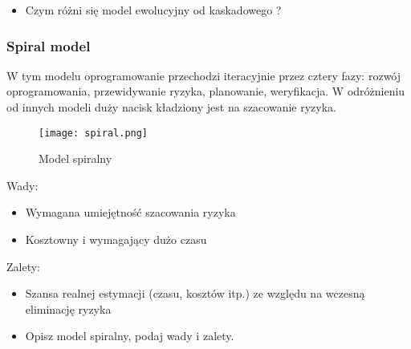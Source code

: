 \documentclass[a4paper,15pt]{article}
\newcommand{\definition}[2]{
    \begin{tcolorbox}[colback=gray!5!white,colframe=gray,title={Definicja -  #1}]
        #2
    \end{tcolorbox}
}
\begin{document}
\begin{framed}
\begin{itemize}
\item Czym różni się model ewolucyjny od kaskadowego ?
\end{itemize}
\end{framed}




\newpage
\subsubsection{Spiral model}


\definition{Spiral model}{
W tym modelu oprogramowanie przechodzi iteracyjnie przez cztery fazy: rozwój oprogramowania, przewidywanie ryzyka, planowanie, weryfikacja. W odróżnieniu od innych modeli duży nacisk kładziony jest na szacowanie ryzyka.
\begin{figure}[H]
\centerline{\texttt{[image: spiral.png]}}
\caption{Model spiralny}
\label{fig:ANTIinhibitor}
\end{figure}

}

\begin{tcolorbox}[colback=red!5!white,colframe=red!75!black]
  Wady:
  \begin{itemize}
  	\item Wymagana umiejętność szacowania ryzyka
  	\item Kosztowny i wymagający dużo czasu
  \end{itemize}
\end{tcolorbox}

\begin{tcolorbox}[colback=green!5!white,colframe=green!75!black]
  Zalety:
  \begin{itemize}
  	\item Szansa realnej estymacji (czasu, kosztów itp.) ze względu na wczesną eliminację ryzyka
  \end{itemize}
\end{tcolorbox}


\begin{framed}
\begin{itemize}
\item Opisz model spiralny, podaj wady i zalety.
\end{itemize}
\end{framed}
\end{document}
